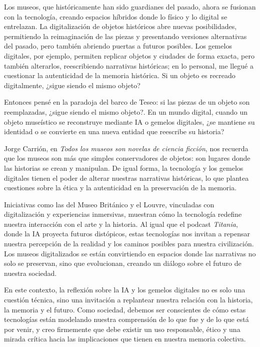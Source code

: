 \documentclass[
  spanish,
  11pt,
  a4paper,
]{scrbook}
\begin{document}
Los museos, que históricamente han sido guardianes del pasado, ahora se
fusionan con la tecnología, creando espacios híbridos donde lo físico y
lo digital se entrelazan. La digitalización de objetos históricos abre
nuevas posibilidades, permitiendo la reimaginación de las piezas y
presentando versiones alternativas del pasado, pero también abriendo
puertas a futuros posibles. Los gemelos digitales, por ejemplo, permiten
replicar objetos y ciudades de forma exacta, pero también alterarlos,
reescribiendo narrativas históricas; en lo personal, me llegué a
cuestionar la autenticidad de la memoria histórica. Si un objeto es
recreado digitalmente, ¿sigue siendo el mismo objeto?

Entonces pensé en la paradoja del barco de Teseo: si las piezas de un
objeto son reemplazadas, ¿sigue siendo el mismo objeto?. En un mundo
digital, cuando un objeto museístico se reconstruye mediante IA o
gemelos digitales, ¿se mantiene su identidad o se convierte en una nueva
entidad que reescribe su historia?

Jorge Carrión, en \emph{Todos los museos son novelas de ciencia
ficción}, nos recuerda que los museos son más que simples conservadores
de objetos: son lugares donde las historias se crean y manipulan. De
igual forma, la tecnología y los gemelos digitales tienen el poder de
alterar nuestras narrativas históricas, lo que plantea cuestiones sobre
la ética y la autenticidad en la preservación de la memoria.

Iniciativas como las del Museo Británico y el Louvre, vinculadas con
digitalización y experiencias inmersivas, muestran cómo la tecnología
redefine nuestra interacción con el arte y la historia. Al igual que el
podcast \emph{Titania}, donde la IA proyecta futuros distópicos, estas
tecnologías nos invitan a repensar nuestra percepción de la realidad y
los caminos posibles para nuestra civilización. Los museos digitalizados
se están convirtiendo en espacios donde las narrativas no solo se
preservan, sino que evolucionan, creando un diálogo sobre el futuro de
nuestra sociedad.

En este contexto, la reflexión sobre la IA y los gemelos digitales no es
solo una cuestión técnica, sino una invitación a replantear nuestra
relación con la historia, la memoria y el futuro. Como sociedad, debemos
ser conscientes de cómo estas tecnologías están modelando nuestra
comprensión de lo que fue y de lo que está por venir, y creo firmemente
que debe existir un uso responsable, ético y una mirada crítica hacia
las implicaciones que tienen en nuestra memoria colectiva.
\end{document}
